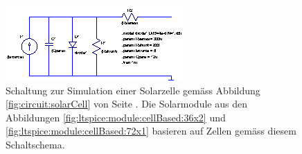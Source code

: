 \begin{figure}[h!tb]
    \centering
    \includegraphics[width=\textwidth]{images/ltspice/singlecell.eps}
    \caption{%
        Schaltung        zur         Simulation        einer        Solarzelle
        gem\"ass        Abbildung       \ref{fig:circuit:solarCell}        von
        Seite     \pageref{fig:circuit:solarCell}. Die     Solarmodule     aus
        den     Abbildungen    \ref{fig:ltspice:module:cellBased:36x2}     und
        \ref{fig:ltspice:module:cellBased:72x1}  basieren auf  Zellen gem\"ass
        diesem Schaltschema.%
    }
    \label{fig:ltspice:solarCell}
\end{figure}

